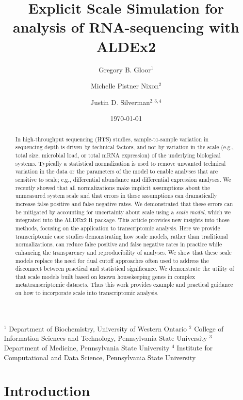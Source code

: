 \documentclass[
]{article}
\title{Explicit Scale Simulation for analysis of RNA-sequencing with
ALDEx2}
\author{Gregory B. Gloor$^1$ \and Michelle Pistner Nixon$^2$ \and Justin D. Silverman$^{2,3,4}$}
\date{\today}
\begin{document}
\maketitle

$^1$ Department of Biochemistry, University of Western Ontario
$^2$ College of Information Sciences and Technology, Pennsylvania  State University
$^3$ Department of Medicine, Pennsylvania  State University
$^4$ Institute for Computational and Data Science, Pennsylvania State University

\begin{abstract}
In high-throughput sequencing (HTS) studies, sample-to-sample variation
in sequencing depth is driven by technical factors, and not by variation
in the scale (e.g., total size, microbial load, or total mRNA
expression) of the underlying biological systems. Typically a
statistical normalization is used to remove unwanted technical variation
in the data or the parameters of the model to enable analyses that are
sensitive to scale; e.g., differential abundance and differential
expression analyses. We recently showed that all normalizations make
implicit assumptions about the unmeasured system scale and that errors
in these assumptions can dramatically increase false positive and false
negative rates. We demonstrated that these errors can be mitigated by
accounting for uncertainty about scale using a \emph{scale model}, which
we integrated into the ALDEx2 R package. This article provides new
insights into those methods, focusing on the application to
transcriptomic analysis. Here we provide transcriptomic case studies
demonstrating how scale models, rather than traditional normalizations,
can reduce false positive and false negative rates in practice while
enhancing the transparency and reproducibility of analyses. We show that
these scale models replace the need for dual cutoff approaches often
used to address the disconnect between practical and statistical
significance. We demonstrate the utility of that scale models built
based on known housekeeping genes in complex metatranscriptomic
datasets. Thus this work provides example and practical guidance on how
to incorporate scale into transcriptomic analysis.
\end{abstract}

\section{Introduction}\label{introduction}

\doublespacing
\end{document}
